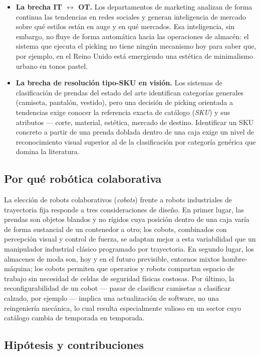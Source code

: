 \documentclass[conference]{IEEEtran}
\begin{document}
\begin{itemize}
\item \textbf{La brecha IT $\leftrightarrow$ OT.} Los departamentos de
marketing analizan de forma continua las tendencias en redes sociales y
generan inteligencia de mercado sobre qué estilos están en auge y en qué
mercados. Esa inteligencia, sin embargo, no fluye de forma automática hacia
las operaciones de almacén: el sistema que ejecuta el picking no tiene
ningún mecanismo hoy para saber que, por ejemplo, en el Reino Unido está
emergiendo una estética de minimalismo urbano en tonos pastel.

\item \textbf{La brecha de resolución tipo-SKU en visión.} Los sistemas de
clasificación de prendas del estado del arte identifican categorías
generales (camiseta, pantalón, vestido), pero una decisión de picking
orientada a tendencias exige conocer la referencia exacta de catálogo
(\emph{SKU}) y sus atributos --- corte, material, estética, mercado de
destino. Identificar un SKU concreto a partir de una prenda doblada dentro de
una caja exige un nivel de reconocimiento visual superior al de la
clasificación por categoría genérica que domina la literatura.
\end{itemize}

\subsection{Por qué robótica colaborativa}

La elección de robots colaborativos (\emph{cobots}) frente a robots
industriales de trayectoria fija responde a tres consideraciones de diseño.
En primer lugar, las prendas son objetos blandos y no rígidos cuya posición
dentro de una caja varía de forma sustancial de un contenedor a otro; los
cobots, combinados con percepción visual y control de fuerza, se adaptan
mejor a esta variabilidad que un manipulador industrial clásico programado
por trayectoria. En segundo lugar, los almacenes de moda son, hoy y en el
futuro previsible, entornos mixtos hombre-máquina; los cobots permiten que
operarios y robots compartan espacio de trabajo sin necesidad de celdas de
seguridad físicas costosas. Por último, la reconfigurabilidad de un cobot
--- pasar de clasificar camisetas a clasificar calzado, por ejemplo ---
implica una actualización de software, no una reingeniería mecánica, lo cual
resulta especialmente valioso en un sector cuyo catálogo cambia de
temporada en temporada.

\subsection{Hipótesis y contribuciones}
\end{document}
